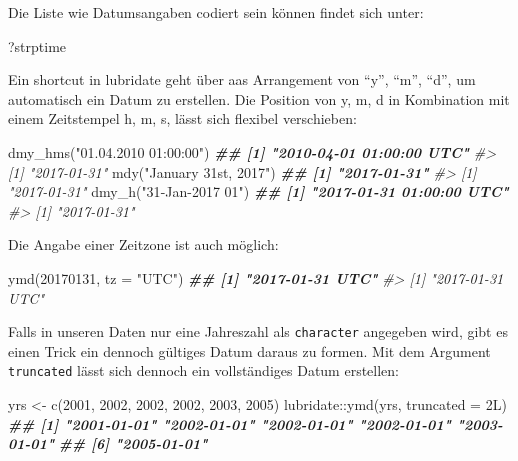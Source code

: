 \documentclass[
]{article}
\newenvironment{Shaded}{\begin{snugshade}}{\end{snugshade}}
\newcommand{\AttributeTok}[1]{\textcolor[rgb]{0.77,0.63,0.00}{#1}}
\newcommand{\CommentTok}[1]{\textcolor[rgb]{0.56,0.35,0.01}{\textit{#1}}}
\newcommand{\DecValTok}[1]{\textcolor[rgb]{0.00,0.00,0.81}{#1}}
\newcommand{\DocumentationTok}[1]{\textcolor[rgb]{0.56,0.35,0.01}{\textbf{\textit{#1}}}}
\newcommand{\FunctionTok}[1]{\textcolor[rgb]{0.00,0.00,0.00}{#1}}
\newcommand{\NormalTok}[1]{#1}
\newcommand{\OtherTok}[1]{\textcolor[rgb]{0.56,0.35,0.01}{#1}}
\newcommand{\SpecialCharTok}[1]{\textcolor[rgb]{0.00,0.00,0.00}{#1}}
\newcommand{\StringTok}[1]{\textcolor[rgb]{0.31,0.60,0.02}{#1}}
\begin{document}
Die Liste wie Datumsangaben codiert sein können findet sich unter:

\begin{Shaded}
\begin{Highlighting}[]
\NormalTok{?strptime}
\end{Highlighting}
\end{Shaded}

Ein shortcut in lubridate geht über aas Arrangement von ``y'', ``m'', ``d'', um automatisch ein Datum zu erstellen. Die Position von y, m, d in Kombination mit einem Zeitstempel h, m, s, lässt sich flexibel verschieben:

\begin{Shaded}
\begin{Highlighting}[]
\FunctionTok{dmy\_hms}\NormalTok{(}\StringTok{"01.04.2010 01:00:00"}\NormalTok{)}
\DocumentationTok{\#\# [1] "2010{-}04{-}01 01:00:00 UTC"}
\CommentTok{\#\textgreater{} [1] "2017{-}01{-}31"}
\FunctionTok{mdy}\NormalTok{(}\StringTok{"January 31st, 2017"}\NormalTok{)}
\DocumentationTok{\#\# [1] "2017{-}01{-}31"}
\CommentTok{\#\textgreater{} [1] "2017{-}01{-}31"}
\FunctionTok{dmy\_h}\NormalTok{(}\StringTok{"31{-}Jan{-}2017 01"}\NormalTok{)}
\DocumentationTok{\#\# [1] "2017{-}01{-}31 01:00:00 UTC"}
\CommentTok{\#\textgreater{} [1] "2017{-}01{-}31"}
\end{Highlighting}
\end{Shaded}

Die Angabe einer Zeitzone ist auch möglich:

\begin{Shaded}
\begin{Highlighting}[]
\FunctionTok{ymd}\NormalTok{(}\DecValTok{20170131}\NormalTok{, }\AttributeTok{tz =} \StringTok{"UTC"}\NormalTok{)}
\DocumentationTok{\#\# [1] "2017{-}01{-}31 UTC"}
\CommentTok{\#\textgreater{} [1] "2017{-}01{-}31 UTC"}
\end{Highlighting}
\end{Shaded}

Falls in unseren Daten nur eine Jahreszahl als \texttt{character} angegeben wird, gibt es einen Trick ein dennoch gültiges Datum daraus zu formen. Mit dem Argument \texttt{truncated} lässt sich dennoch ein vollständiges Datum erstellen:

\begin{Shaded}
\begin{Highlighting}[]
\NormalTok{yrs }\OtherTok{\textless{}{-}} \FunctionTok{c}\NormalTok{(}\DecValTok{2001}\NormalTok{, }\DecValTok{2002}\NormalTok{, }\DecValTok{2002}\NormalTok{, }\DecValTok{2002}\NormalTok{, }\DecValTok{2003}\NormalTok{, }\DecValTok{2005}\NormalTok{)}
\NormalTok{lubridate}\SpecialCharTok{::}\FunctionTok{ymd}\NormalTok{(yrs, }\AttributeTok{truncated =}\NormalTok{ 2L)}
\DocumentationTok{\#\# [1] "2001{-}01{-}01" "2002{-}01{-}01" "2002{-}01{-}01" "2002{-}01{-}01" "2003{-}01{-}01"}
\DocumentationTok{\#\# [6] "2005{-}01{-}01"}
\end{Highlighting}
\end{Shaded}
\end{document}
